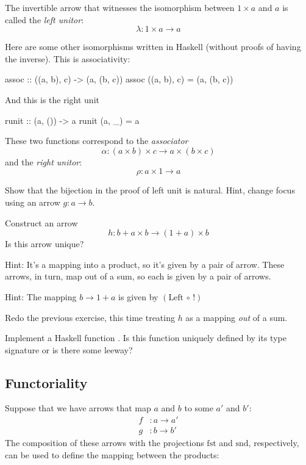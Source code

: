 \documentclass[DaoFP]{subfiles}
\begin{document}
The invertible arrow that witnesses the isomorphism between $1 \times a$ and $a$ is called the \emph{left unitor}:
\[ \lambda \colon 1 \times a \to a \]

Here are some other isomorphisms written in Haskell (without proofs of having the inverse). This is associativity:
\begin{haskell}
assoc :: ((a, b), c) -> (a, (b, c))
assoc ((a, b), c) = (a, (b, c))
\end{haskell}
And this is the right unit
\begin{haskell}
runit :: (a, ()) -> a
runit (a, _) = a
\end{haskell}

These two functions correspond to the \emph{associator}
\[ \alpha \colon (a \times b) \times c \to a \times (b \times c) \]
and the \emph{right unitor}:
\[ \rho \colon a \times 1 \to a \]

\begin{exercise}
Show that the bijection in the proof of left unit is natural. Hint, change focus using an arrow $g \colon a \to b$.
\end{exercise}

\begin{exercise}
Construct an arrow 
\[ h \colon b + a \times b \to (1 + a) \times b \]
Is this arrow unique?

Hint: It's a mapping into a product, so it's given by a pair of arrow. These arrows, in turn, map out of a sum, so each is given by a pair of arrows. 

Hint: The mapping $b \to 1 + a$ is given by $(\text{Left} \, \circ \, !)$
\end{exercise}

\begin{exercise}
Redo the previous exercise, this time treating $h$ as a mapping \emph{out} of a sum. 
\end{exercise}

\begin{exercise}
Implement a Haskell function . Is this function uniquely defined by its type signature or is there some leeway?
\end{exercise}

\subsection{Functoriality}

Suppose that we have arrows that map $a$ and $b$ to some $a'$ and $b'$:
\begin{align*}
f &\colon a \to a' \\
g &\colon b \to b'
\end{align*}
The composition of these arrows with the projections $\text{fst}$ and $\text{snd}$, respectively, can be used to define the mapping between the products:
\end{document}
